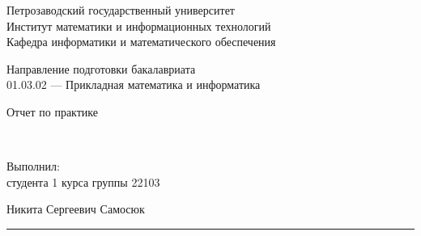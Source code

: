 \documentclass[a4paper,12pt]{article}
\newcommand{\myrule}[1]{\rule{#1}{0.4pt}}
\newcommand{\sign}[2][~]{{\small\myrule{#2}\\[-0.7em]\makebox[#2]{\it #1}}}
\renewcommand{\baselinestretch}{1.50}
\begin{document}

\thispagestyle{empty}
\begin{center}


\renewcommand{\baselinestretch}{1}
{\large
{\sc Петрозаводский государственный университет\\
Институт математики и информационных технологий\\
Кафедра информатики и математического обеспечения
}
}

\end{center}


\begin{center}
%
%
 Направление подготовки бакалавриата \\
 01.03.02 --- Прикладная математика и информатика \\
\end{center}

\vfill

\begin{center}
{\normalsize 
	Отчет по практике}

\medskip

	{\Large {}} \\
\end{center}

\medskip

\begin{flushright}
\parbox{11cm}{%
\renewcommand{\baselinestretch}{1.2}
\normalsize
	Выполнил:\\
студента 1 курса группы 22103
\begin{flushright}
	Никита Сергеевич Самосюк \sign[подпись]{4cm}
\end{flushright}


}
\end{flushright}
\end{document}
